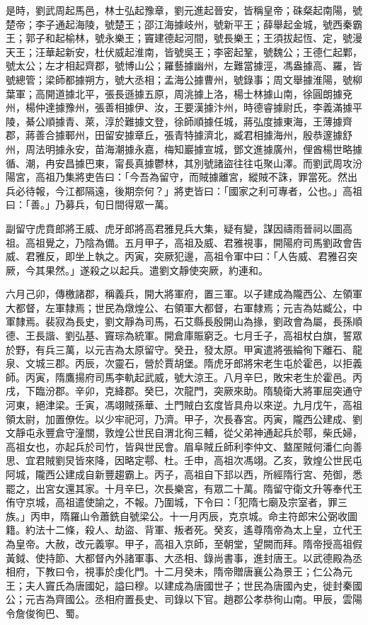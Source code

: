 \begin{pinyinscope}
 是時，劉武周起馬邑，林士弘起豫章，劉元進起晉安，皆稱皇帝；硃粲起南陽，號楚帝；李子通起海陵，號楚王；邵江海據岐州，號新平王；薛舉起金城，號西秦霸王；郭子和起榆林，號永樂王；竇建德起河間，號長樂王；王須拔起恆、定，號漫天王；汪華起新安，杜伏威起淮南，皆號吳王；李密起鞏，號魏公；王德仁起鄴，號太公；左才相起齊郡，號博山公；羅藝據幽州，左難當據涇，馮盎據高、羅，皆號總管；梁師都據朔方，號大丞相；孟海公據曹州，號錄事；周文舉據淮陽，號柳葉軍；高開道據北平，張長遜據五原，周洮據上洛，楊士林據山南，徐圓朗據兗州，楊仲達據豫州，張善相據伊、汝，王要漢據汴州，時德睿據尉氏，李義滿據平陵，綦公順據青、萊，淳於難據文登，徐師順據任城，蔣弘度據東海，王薄據齊郡，蔣善合據鄆州，田留安據章丘，張青特據濟北，臧君相據海州，殷恭邃據舒州，周法明據永安，苗海潮據永嘉，梅知巖據宣城，鄧文進據廣州，俚酋楊世略據循、潮，冉安昌據巴東，甯長真據鬱林，其別號諸盜往往屯聚山澤。而劉武周攻汾陽宮，高祖乃集將吏告曰：「今吾為留守，而賊據離宮，縱賊不誅，罪當死。然出兵必待報，今江都隔遠，後期奈何？」將吏皆曰：「國家之利可專者，公也。」高祖曰：「善。」乃募兵，旬日間得眾一萬。



 副留守虎賁郎將王威、虎牙郎將高君雅見兵大集，疑有變，謀因禱雨晉祠以圖高祖。高祖覺之，乃陰為備。五月甲子，高祖及威、君雅視事，開陽府司馬劉政會告威、君雅反，即坐上執之。丙寅，突厥犯邊，高祖令軍中曰：「人告威、君雅召突厥，今其果然。」遂殺之以起兵。遣劉文靜使突厥，約連和。



 六月己卯，傳檄諸郡，稱義兵，開大將軍府，置三軍。以子建成為隴西公、左領軍大都督，左軍隸焉；世民為燉煌公、右領軍大都督，右軍隸焉；元吉為姑臧公，中軍隸焉。裴寂為長史，劉文靜為司馬，石艾縣長殷開山為掾，劉政會為屬，長孫順德、王長諧、劉弘基、竇琮為統軍。開倉庫賑窮乏。七月壬子，高祖杖白旗，誓眾於野，有兵三萬，以元吉為太原留守。癸丑，發太原。甲寅遣將張綸徇下離石、龍泉、文城三郡。丙辰，次靈石，營於賈胡堡。隋虎牙郎將宋老生屯於霍邑，以拒義師。丙寅，隋鷹揚府司馬李軌起武威，號大涼王。八月辛巳，敗宋老生於霍邑。丙戌，下臨汾郡。辛卯，克絳郡。癸巳，次龍門，突厥來助。隋驍衛大將軍屈突通守河東，絕津梁。壬寅，馮翊賊孫華、土門賊白玄度皆具舟以來逆。九月戊午，高祖領太尉，加置僚佐。以少牢祀河，乃濟。甲子，次長春宮。丙寅，隴西公建成、劉文靜屯永豐倉守潼關，敦煌公世民自渭北徇三輔，從父弟神通起兵於鄠，柴氏婦，高祖女也，亦起兵於司竹，皆與世民會。眉阜賊丘師利李仲文、盩厔賊何潘仁向善思、宜君賊劉炅皆來降，因略定鄠、杜。壬申，高祖次馮翊。乙亥，敦煌公世民屯阿城，隴西公建成自新豐趨霸上。丙子，高祖自下邽以西，所經隋行宮、苑御，悉罷之，出宮女還其家。十月辛巳，次長樂宮，有眾二十萬。隋留守衛文升等奉代王侑守京城，高祖遣使諭之，不報。乃圍城，下令曰：「犯隋七廟及宗室者，罪三族。」丙申，隋羅山令蕭銑自號梁公。十一月丙辰，克京城。命主符郎宋公弼收圖籍。約法十二條，殺人、劫盜、背軍、叛者死。癸亥，遙尊隋帝為太上皇，立代王為皇帝。大赦，改元義寧。甲子，高祖入京師，至朝堂，望闕而拜。隋帝授高祖假黃鉞、使持節、大都督內外諸軍事、大丞相、錄尚書事，進封唐王。以武德殿為丞相府，下教曰令，視事於虔化門。十二月癸未，隋帝贈唐襄公為景王；仁公為元王；夫人竇氏為唐國妃，謚曰穆。以建成為唐國世子；世民為唐國內史，徙封秦國公；元吉為齊國公。丞相府置長史、司錄以下官。趙郡公孝恭徇山南。甲辰，雲陽令詹俊徇巴、蜀。




\end{pinyinscope}
